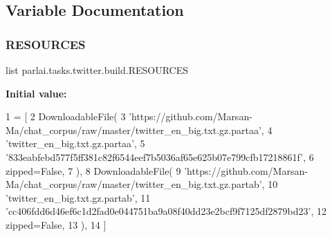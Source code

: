 \subsection{Variable Documentation}
\mbox{\label{namespaceparlai_1_1tasks_1_1twitter_1_1build_a2c0605933d8e8d1526253c362e5db67e}} 
\subsubsection{\texorpdfstring{R\+E\+S\+O\+U\+R\+C\+ES}{RESOURCES}}
{\footnotesize\ttfamily list parlai.\+tasks.\+twitter.\+build.\+R\+E\+S\+O\+U\+R\+C\+ES}

{\bfseries Initial value\+:}
\begin{DoxyCode}
1 =  [
2     DownloadableFile(
3         \textcolor{stringliteral}{'https://github.com/Marsan-Ma/chat\_corpus/raw/master/twitter\_en\_big.txt.gz.partaa'},
4         \textcolor{stringliteral}{'twitter\_en\_big.txt.gz.partaa'},
5         \textcolor{stringliteral}{'833eabfebd577f5ff381c82f6544eef7b5036af65e625b07e799cfb17218861f'},
6         zipped=\textcolor{keyword}{False},
7     ),
8     DownloadableFile(
9         \textcolor{stringliteral}{'https://github.com/Marsan-Ma/chat\_corpus/raw/master/twitter\_en\_big.txt.gz.partab'},
10         \textcolor{stringliteral}{'twitter\_en\_big.txt.gz.partab'},
11         \textcolor{stringliteral}{'cc406fdd6d46ef6c1d2fad0e044751ba9a08f40dd23e2bcf9f7125df2879bd23'},
12         zipped=\textcolor{keyword}{False},
13     ),
14 ]
\end{DoxyCode}
